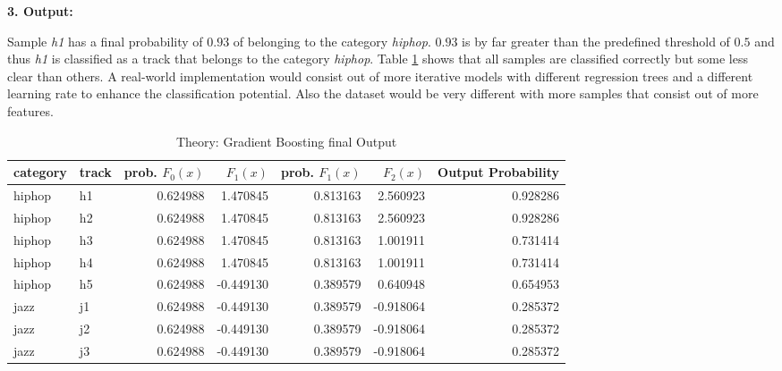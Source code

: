 \textbf{3. Output:}

Sample \emph{h1} has a final probability of \(0.93\) of belonging to the category \emph{hiphop}. \(0.93\) is by far greater than the 
predefined threshold of \(0.5\) and thus \emph{h1} is classified as a track that belongs to the category \emph{hiphop}. Table \ref{tbl:theory_gb_final_output} shows
that all samples are classified correctly but some less clear than others. A real-world implementation would consist 
out of more iterative models with different regression trees and a different learning rate to enhance the 
classification potential. Also the dataset would be very different with more samples that consist out of more features. 

\begin{table}[H]
    \centering
    \begin{tabular}{llrrrrr}
        \toprule
        category & track &  prob. \(F_{0}(x)\) &    \(F_{1}(x)\) &  prob. \(F_{1}(x)\) &       \(F_{2}(x)\) &  Output Probability \\
        \midrule
          hiphop &    h1 &         0.624988 &  1.470845 &         0.813163 &  2.560923 &                          0.928286 \\
          hiphop &    h2 &         0.624988 &  1.470845 &         0.813163 &  2.560923 &                          0.928286 \\
          hiphop &    h3 &         0.624988 &  1.470845 &         0.813163 &  1.001911 &                          0.731414 \\
          hiphop &    h4 &         0.624988 &  1.470845 &         0.813163 &  1.001911 &                          0.731414 \\
          hiphop &    h5 &         0.624988 & -0.449130 &         0.389579 &  0.640948 &                          0.654953 \\
            jazz &    j1 &         0.624988 & -0.449130 &         0.389579 & -0.918064 &                          0.285372 \\
            jazz &    j2 &         0.624988 & -0.449130 &         0.389579 & -0.918064 &                          0.285372 \\
            jazz &    j3 &         0.624988 & -0.449130 &         0.389579 & -0.918064 &                          0.285372 \\
        \bottomrule
        \end{tabular}           
    \caption{Theory: Gradient Boosting final Output}%
    \label{tbl:theory_gb_final_output}%
  \end{table} 

